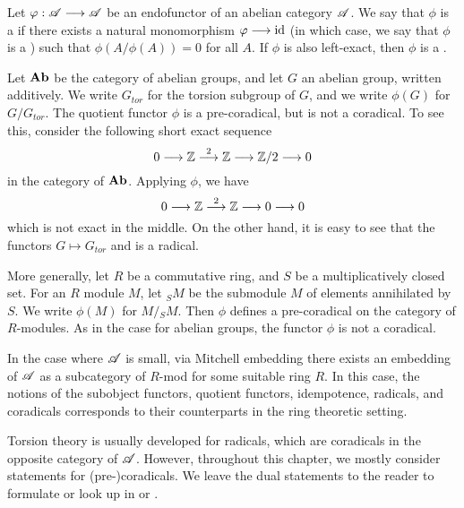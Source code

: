 \begin{defn}\label{def_radical}
Let $\varphi: \mathscr{A} \longrightarrow \mathscr{A}$ be an endofunctor of an abelian 
category $\mathscr{A}$. We say that $\phi$ is a  if 
there exists a natural monomorphism $\varphi \longrightarrow \mathrm{id}$ (in which case, we
say that $\phi$ is a ) such that 
$\phi(A/\phi(A)) = 0$ for all $A$. If $\phi$ is also left-exact, then
$\phi$ is a .
\end{defn}

\begin{ex}
Let $\mathbf{Ab}$ be the category of abelian groups, and let $G$ an
abelian group, written additively. We write $G_{tor}$ for the 
torsion subgroup of $G$, and we write $\phi(G)$ for $G/G_{tor}$.
The quotient functor $\phi$ is a pre-coradical, but is not a 
coradical. To see this, consider the following short exact 
sequence
\[
0 \longrightarrow \mathbb{Z} \stackrel{2}{\longrightarrow} \mathbb{Z} \longrightarrow \mathbb{Z}/2 \longrightarrow 0
\]
in the category of $\mathbf{Ab}$. Applying $\phi$, we have
\[
0 \longrightarrow \mathbb{Z} \stackrel{2}{\longrightarrow} \mathbb{Z} \longrightarrow 0 \longrightarrow 0
\]
which is not exact in the middle. On the other hand, it is easy to 
see that the functors $G \mapsto G_{tor}$ and is a radical.

More generally, let $R$ be a commutative ring, and $S$ be a 
multiplicatively closed set. For an $R$ module $M$, let ${}_SM$
be the submodule $M$ of elements annihilated by $S$. We write
$\phi(M)$ for $M/{}_SM$. Then $\phi$ defines a pre-coradical on
the category of $R$-modules. As in the case for abelian groups,
the functor $\phi$ is not a coradical.
\end{ex}

\begin{rmk*}
  In the case where $\mathscr{A}$ is small, via Mitchell embedding there
  exists an embedding of $\mathscr{A}$ as a subcategory of $R$-mod for
  some suitable ring $R$. In this case, the notions of the subobject
  functors, quotient functors, idempotence, radicals, and coradicals
  corresponds to their counterparts in the ring theoretic setting.
\end{rmk*}

Torsion theory is usually developed for radicals, which 
are coradicals in the opposite category of $\mathscr{A}$. However, 
throughout this chapter, we mostly consider statements for
(pre-)coradicals. We leave the dual statements to the 
reader to formulate or look up in \cite{DTor} or 
\cite[Section 1.2]{BJV}.

